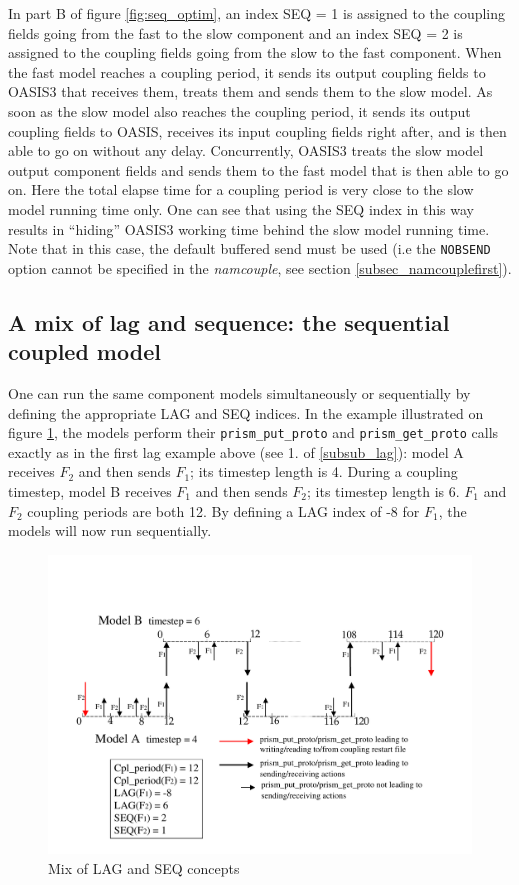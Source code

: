 In part B of figure \ref{fig:seq_optim}, an index SEQ = 1 is assigned to the
coupling fields going from the fast to the slow component and an index
SEQ = 2 is assigned to the coupling fields going from the slow to the
fast component. When the fast model reaches a coupling period, it
sends its output coupling fields to OASIS3 that receives them, treats
them and sends them to the slow model.  As soon as the slow model also
reaches the coupling period, it sends its output coupling fields to
OASIS, receives its input coupling fields right after, and is then
able to go on without any delay.  Concurrently, OASIS3 treats the slow
model output component fields and sends them to the fast model that is
then able to go on. Here the total elapse time for a coupling period
is very close to the slow model running time only. One can see that
using the SEQ index in this way results in ``hiding'' OASIS3 working
time behind the slow model running time. Note that in this case, the
default buffered send must be used (i.e the {\tt NOBSEND} option
cannot be specified in the {\it namcouple}, see section
\ref{subsec_namcouplefirst}).

\subsection{A mix of lag and sequence: the sequential coupled model}
\label{subsubsec_mix}

One can run the same component models simultaneously or sequentially
by defining the appropriate LAG and SEQ indices. In the example
illustrated on figure \ref{fig:mix_seqlag}, the models perform their
{\tt prism\_put\_proto} and {\tt prism\_get\_proto} calls exactly as
in the first lag example above (see 1. of \ref{subsub_lag}): model A receives $F_2$ and then sends
$F_1$; its timestep length is 4. During a coupling timestep, model B
receives $F_1$ and then sends $F_2$; its timestep length is 6.  $F_1$
and $F_2$ coupling periods are both 12. By defining a LAG index of -8
for $F_1$, the models will now run sequentially.

\begin{figure}
\includegraphics[scale=.6]{figures/fig_mix_seqlag}
\caption{Mix of LAG and SEQ concepts}
\label{fig:mix_seqlag}
\end{figure}

